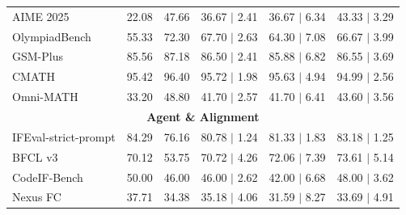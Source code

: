 \begin{table}[htbp]
{\begin{tabular}{lcc|ccc}
\midrule
AIME 2025 & 22.08 & 47.66 & 36.67 $\mid$ 2.41 & 36.67 $\mid$ 6.34 &  43.33 $\mid$ 3.29 \\
OlympiadBench & 55.33 & 72.30 & 67.70 $\mid$ 2.63 & 64.30 $\mid$ 7.08 &  66.67 $\mid$ 3.99 \\
GSM-Plus & 85.56 & 87.18 & 86.50 $\mid$ 2.41 & 85.88 $\mid$ 6.82 &  86.55 $\mid$ 3.69 \\
CMATH & 95.42 & 96.40 & 95.72 $\mid$ 1.98 & 95.63 $\mid$ 4.94 &  94.99 $\mid$ 2.56 \\
Omni-MATH & 33.20 & 48.80 & 41.70 $\mid$ 2.57 & 41.70 $\mid$ 6.41 &  43.60 $\mid$ 3.56 \\
\midrule
\multicolumn{6}{c}{\textbf{Agent \& Alignment}} \\
\midrule
IFEval-strict-prompt & 84.29 & 76.16 & 80.78 $\mid$ 1.24 & 81.33 $\mid$ 1.83 &  83.18 $\mid$ 1.25 \\
BFCL v3 & 70.12 & 53.75 & 70.72 $\mid$ 4.26 & 72.06 $\mid$ 7.39 &  73.61 $\mid$ 5.14 \\
CodeIF-Bench & 50.00 & 46.00 & 46.00 $\mid$ 2.62 & 42.00 $\mid$ 6.68 &  48.00 $\mid$ 3.62 \\
Nexus FC & 37.71 & 34.38 & 35.18 $\mid$ 4.06 & 31.59 $\mid$ 8.27 &  33.69 $\mid$ 4.91 \\
\bottomrule
\end{tabular}%
}
\end{table}
